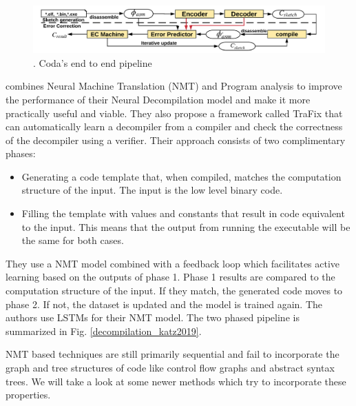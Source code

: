 \documentclass{article}
\begin{document}
\begin{figure}[ht]
\vskip 0.2in
\begin{center}
\centerline{\includegraphics[width=\textwidth]{Images/decompilation_coda.png}}
\caption{\citet{coda}. Coda's end to end pipeline}
\label{decompilation_coda}
\end{center}
\vskip -0.2in
\end{figure}

\citet{katz2019towards} combines Neural Machine Translation (NMT) and Program analysis to improve the performance of their Neural Decompilation model and make it more practically useful and viable. They also propose a framework called TraFix that can automatically learn a decompiler from a compiler and check the correctness of the decompiler using a verifier. Their approach consists of two complimentary phases:
\begin{itemize}
    \item Generating a code template that, when compiled, matches the computation structure of
the input. The input is the low level binary code.
    \item Filling the template with values and constants that result in code equivalent to the input. This means that the output from running the executable will be the same for both cases.
\end{itemize}
They use a NMT model combined with a feedback loop which facilitates active learning based on the outputs of phase 1. Phase 1 results are compared to the computation structure of the input. If they match, the generated code moves to phase 2. If not, the dataset is updated and the model is trained again. The authors use LSTMs for their NMT model. The two phased pipeline is summarized in Fig. \ref{decompilation_katz2019}.

NMT based techniques are still primarily sequential and fail to incorporate the graph and tree structures of code like control flow graphs and abstract syntax trees. We will take a look at some newer methods which try to incorporate these properties.
\end{document}
